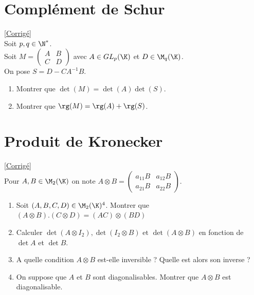 \documentclass[8pt]{book}
\begin{document}
	\section{Complément de Schur }
	\label{Complément de Schur}
	\textcolor{blue}{\hyperref[Complément de Schur corrigé]{[Corrigé]}}\\
	Soit $p,q\in \N^*$.\\
	Soit $M=\left(
	\begin{array}{c|c}
		A&B\\
		\hline
		C&D
	\end{array}\right)$
	avec $A\in GL_p(\K)$ et $D\in \M_q(\K)$.\\
	On pose $S=D-CA^{-1}B$.
	\begin{enumerate}
		\item Montrer que $\det(M)=\det(A)\det(S)$.
		\item Montrer que $\rg(M)=\rg(A)+\rg(S)$.
	\end{enumerate}
	
 	\section{Produit de Kronecker }
 	\label{Produit de Kronecker}
 	\textcolor{blue}{\hyperref[Produit de Kronecker corrigé]{[Corrigé]}}\\
	Pour $A,B\in \M_2(\K)$ on note $A\otimes B=\left(
	\begin{array}{c|c}
		a_{11}B&a_{12}B\\
		\hline
		a_{21}B&a_{22}B
	\end{array}\right)$.
	\begin{enumerate}
		\item Soit $(A,B,C,D)\in \M_2(\K)^4$. Montrer que $(A\otimes B).(C\otimes D)=(AC)\otimes (BD)$
		\item Calculer $\det{(A\otimes I_2)},\det{(I_2\otimes B)}\text{ et }\det{(A\otimes B)}$ en fonction de $\det{A}$ et $\det{B}$.
		\item A quelle condition $A\otimes B$ est-elle inversible ? Quelle est alors son inverse ?
		\item On suppose que $A$ et $B$ sont diagonalisables. Montrer que $A\otimes B$ est diagonalisable.
	\end{enumerate}
	
\end{document}
